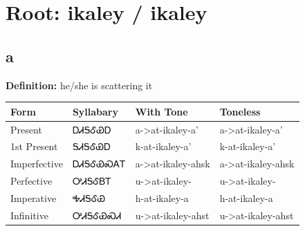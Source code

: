 \documentclass{article}%
\begin{document}
%
\normalsize%
\section*{Root: ikaley / ikaley}%
\subsection*{a}%
\textbf{Definition: }%
he/she is scattering it%
\\[0.5em]%
\begin{tabular}{|l|l|l|l|}%
\hline%
\textbf{Form}&\textbf{Syllabary}&\textbf{With Tone}&\textbf{Toneless}\\%
\hline%
Present&ᎠᏗᎦᎴᏯᎠ&a{-}>at{-}ikaley{-}a'&a{-}>at{-}ikaley{-}a'\\%
1st Present&ᎦᏗᎦᎴᏯᎠ&k{-}at{-}ikaley{-}a'&k{-}at{-}ikaley{-}a'\\%
Imperfective&ᎠᏗᎦᎴᏯᏍᎪᎢ&a{-}>at{-}ikaley{-}ahsk&a{-}>at{-}ikaley{-}ahsk\\%
Perfective&ᎤᏗᎦᎴᏴᎢ&u{-}>at{-}ikaley{-}&u{-}>at{-}ikaley{-}\\%
Imperative&ᎭᏗᎦᎴᏯ&h{-}at{-}ikaley{-}a&h{-}at{-}ikaley{-}a\\%
Infinitive&ᎤᏗᎦᎴᏯᏍᏗ&u{-}>at{-}ikaley{-}ahst&u{-}>at{-}ikaley{-}ahst\\%
\hline%
\end{tabular}%
\\[1em]%
\end{document}
